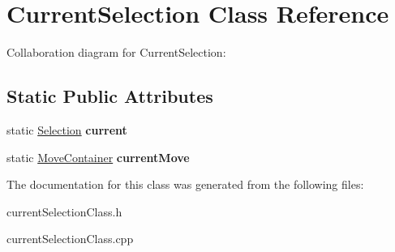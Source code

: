 \hypertarget{classCurrentSelection}{}\section{Current\+Selection Class Reference}
\label{classCurrentSelection}


Collaboration diagram for Current\+Selection\+:
\subsection*{Static Public Attributes}
\begin{DoxyCompactItemize}
\item 
static \hyperlink{structSelection}{Selection} {\bfseries current}\hypertarget{classCurrentSelection_abbf6e9d4b548cc625ab8b72b2f02201e}{}\label{classCurrentSelection_abbf6e9d4b548cc625ab8b72b2f02201e}

\item 
static \hyperlink{structMoveContainer}{Move\+Container} {\bfseries current\+Move}\hypertarget{classCurrentSelection_acaa58f53204058cc4f202fd088cc80dc}{}\label{classCurrentSelection_acaa58f53204058cc4f202fd088cc80dc}

\end{DoxyCompactItemize}


The documentation for this class was generated from the following files\+:\begin{DoxyCompactItemize}
\item 
current\+Selection\+Class.\+h\item 
current\+Selection\+Class.\+cpp\end{DoxyCompactItemize}
